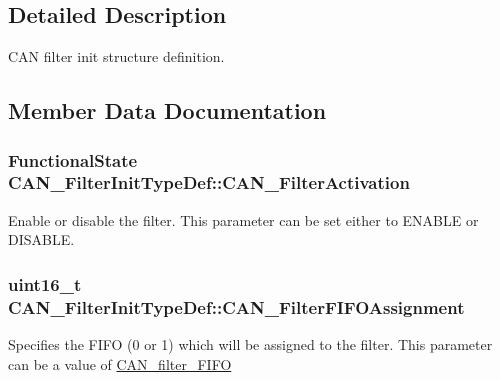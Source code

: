 \subsection{Detailed Description}
C\+A\+N filter init structure definition. 

\subsection{Member Data Documentation}
\hypertarget{struct_c_a_n___filter_init_type_def_a0225afda33b565f358ca75bdaa780074}{}
\subsubsection[{C\+A\+N\+\_\+\+Filter\+Activation}]{\setlength{\rightskip}{0pt plus 5cm}Functional\+State C\+A\+N\+\_\+\+Filter\+Init\+Type\+Def\+::\+C\+A\+N\+\_\+\+Filter\+Activation}\label{struct_c_a_n___filter_init_type_def_a0225afda33b565f358ca75bdaa780074}
Enable or disable the filter. This parameter can be set either to E\+N\+A\+B\+L\+E or D\+I\+S\+A\+B\+L\+E. \hypertarget{struct_c_a_n___filter_init_type_def_a01ba491f12097adcc9f0a3d627628d55}{}
\subsubsection[{C\+A\+N\+\_\+\+Filter\+F\+I\+F\+O\+Assignment}]{\setlength{\rightskip}{0pt plus 5cm}uint16\+\_\+t C\+A\+N\+\_\+\+Filter\+Init\+Type\+Def\+::\+C\+A\+N\+\_\+\+Filter\+F\+I\+F\+O\+Assignment}\label{struct_c_a_n___filter_init_type_def_a01ba491f12097adcc9f0a3d627628d55}
Specifies the F\+I\+F\+O (0 or 1) which will be assigned to the filter. This parameter can be a value of \hyperlink{group___c_a_n__filter___f_i_f_o}{C\+A\+N\+\_\+filter\+\_\+\+F\+I\+F\+O} \hypertarget{struct_c_a_n___filter_init_type_def_afc109aa8eedced09d296605f2eb871f7}{}
